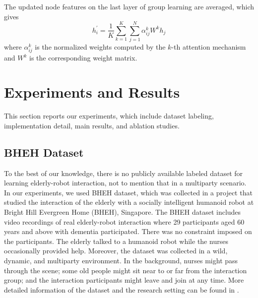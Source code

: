 \documentclass[VANCOUVER,STIX1COL]{WileyNJD-v2}
\begin{document}
The updated node features on the last layer of group learning are averaged, which gives
\begin{equation}
  h_i^{\prime} = \frac{1}{K}\sum\limits_{k=1}^K \sum\limits_{j=1}^N \alpha_{ij}^k W^k h_j
\end{equation}
where $\alpha_{ij}^k$ is the normalized weights computed by the $k$-th attention mechanism and $W^k$ is the corresponding weight matrix.


\section{Experiments and Results}
\label{s:Experiments_and_Results}

This section reports our experiments, which include dataset labeling, implementation detail, main results, and ablation studies.

\subsection{BHEH Dataset}
\label{subs:BHEH_Dataset}

To the best of our knowledge, there is no publicly available labeled dataset for learning elderly-robot interaction, not to mention that in a multiparty scenario. In our experiments, we used BHEH dataset, which was collected in a project that studied the interaction of the elderly with a socially intelligent humanoid robot at Bright Hill Evergreen Home (BHEH), Singapore.
The BHEH dataset includes video recordings of real elderly-robot interaction where 29 participants aged 60 years and above with dementia participated. There was no constraint imposed on the participants. The elderly talked to a humanoid robot while the nurses occasionally provided help. Moreover, the dataset was collected in a wild, dynamic, and multiparty environment. In the background, nurses might pass through the scene; some old people might sit near to or far from the interaction group; and the interaction participants might leave and join at any time.
More detailed information of the dataset and the research setting can be found in \cite{Mishra2021Does,Tulsulkar2021Can}.
\end{document}
